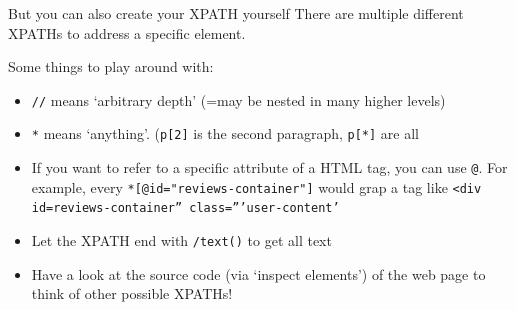 \documentclass{beamer}
\begin{document}
{\begin{frame}[plain]
\end{frame}
\begin{frame}[plain]
\end{frame}
\begin{frame}[plain]
\end{frame}

}




\begin{frame}{But you can also create your XPATH yourself}
There are multiple different XPATHs to address a specific element.

Some things to play around with:
\begin{itemize}
\item<1-> \texttt{//} means `arbitrary depth' (=may be nested in many higher levels)
\item<2->  \texttt{*} means `anything'. (\texttt{p[2]} is the second paragraph, \texttt{p[*]} are all
\item<3-> If you want to refer to a specific attribute of a HTML tag, you can use \texttt{@}. For example, every \texttt{*[@id="reviews-container"]} would grap a tag like \texttt{<div id=reviews-container'' class='''user-content'}
\item<4->  Let the XPATH end with \texttt{/text()} to get all text
\item<5->  Have a look at the source code (via `inspect elements') of the web page to think of other possible XPATHs!
\end{itemize}
\end{frame}
\end{document}
